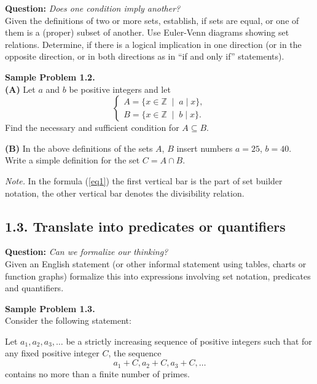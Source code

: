 \documentclass[jou]{apa6}
\begin{document}
{\bf Question:} {\em Does one condition imply another?}\\
{\scriptsize 
Given the definitions of two or more sets, establish, if sets are equal, 
or one of them is a (proper) subset of another. Use Euler-Venn diagrams 
showing set relations. Determine, if there is a logical implication 
in one direction (or in the opposite direction, or in both directions 
as in ``if and only if'' statements).
}

\vspace{6pt}
{\bf Sample Problem 1.2.}\\
{\bf (A)} Let $a$ and $b$ be positive integers and let
\begin{equation}
\label{eq1}
\left\{ \begin{array}{l}
A = \{ x \in \mathbb{Z}\;\mid\;a\mid{}x\},\\
B = \{ x \in \mathbb{Z}\;\mid\;b\mid{}x\}.
\end{array} \right.
\end{equation}
Find the necessary and sufficient condition for $A \subseteq B$. 

{\bf (B)} In the above definitions of the sets $A$, $B$ insert numbers
$a = 25$, $b = 40$. Write a simple definition for the set $C = A \cap B$. 

\vspace{4pt}
{\em Note.} In the formula (\ref{eq1}) the first vertical 
bar is the part of set builder notation, the other vertical 
bar denotes the divisibility relation.



\subsection{1.3. Translate into predicates or quantifiers} 

{\bf Question:} {\em Can we formalize our thinking?}\\
{\scriptsize
Given an English statement (or other informal statement using tables, charts or function graphs) 
formalize this into expressions involving set notation, predicates and quantifiers. 
}


\vspace{6pt}
{\bf Sample Problem 1.3.}\\
Consider the following statement:
\begin{mdframed}[roundcorner=6pt]
Let $a_1,a_2,a_3,\ldots$ be a strictly increasing sequence of positive integers such that for any fixed positive integer $C$, the
sequence 
$$a_1+C, a_2+C, a_3 + C, \ldots$$
contains no more than a finite number of primes. 
\end{mdframed}
\end{document}
